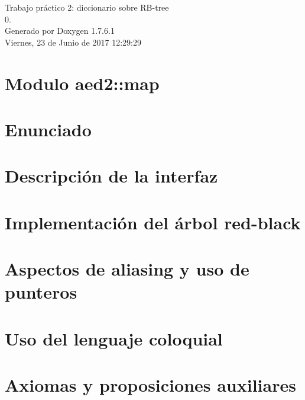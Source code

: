 \documentclass[a4paper]{article}
\begin{document}
\hypersetup{pageanchor=false,citecolor=blue}
\begin{titlepage}
\vspace*{7cm}
\begin{center}
{\Large \-Trabajo práctico 2\-: diccionario sobre \-R\-B-\/tree \\[1ex]\large 0. }\\
\vspace*{1cm}
{\large \-Generado por Doxygen 1.7.6.1}\\
\vspace*{0.5cm}
{\small Viernes, 23 de Junio de 2017 12:29:29}\\
\end{center}
\end{titlepage}
\tableofcontents
{}
\hypersetup{pageanchor=true,citecolor=blue}
\section{\-Modulo aed2\-:\-:map}
\label{index}\hypertarget{index}{}
\section{\-Enunciado}
\label{Enunciado}
\hypertarget{Enunciado}{}

\section{\-Descripción de la interfaz}
\label{Interfaz}
\hypertarget{Interfaz}{}

\section{\-Implementación del árbol red-\/black}
\label{Implementacion}
\hypertarget{Implementacion}{}

\section{\-Aspectos de aliasing y uso de punteros}
\label{Aliasing}
\hypertarget{Aliasing}{}

\section{\-Uso del lenguaje coloquial}
\label{Castellano}
\hypertarget{Castellano}{}

\section{\-Axiomas y proposiciones auxiliares}
\label{axiomas}
\hypertarget{axiomas}{}

\end{document}
